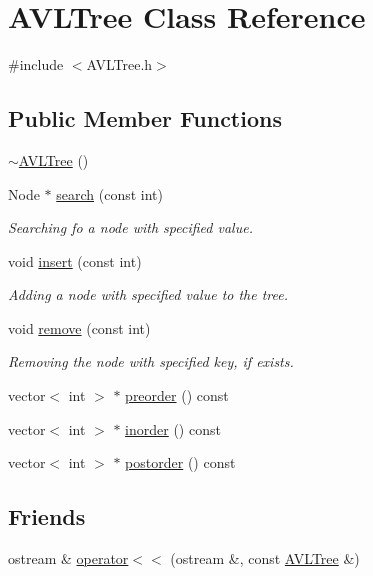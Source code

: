 \hypertarget{classAVLTree}{\section{A\-V\-L\-Tree Class Reference}
\label{classAVLTree}
}


{\ttfamily \#include $<$A\-V\-L\-Tree.\-h$>$}

\subsection*{Public Member Functions}
\begin{DoxyCompactItemize}
\item 
\hyperlink{classAVLTree_af4a1d1be1b6301ba59c6e101c6efc6ba}{$\sim$\-A\-V\-L\-Tree} ()
\item 
Node $\ast$ \hyperlink{classAVLTree_a03178f48ba61b538ec0b1394fec938b4}{search} (const int)
\begin{DoxyCompactList}\small\item\em Searching fo a node with specified value. \end{DoxyCompactList}\item 
void \hyperlink{classAVLTree_a50bc0809a20d87d79838b98b30e94ece}{insert} (const int)
\begin{DoxyCompactList}\small\item\em Adding a node with specified value to the tree. \end{DoxyCompactList}\item 
void \hyperlink{classAVLTree_a8671295418947911e9387549116f89eb}{remove} (const int)
\begin{DoxyCompactList}\small\item\em Removing the node with specified key, if exists. \end{DoxyCompactList}\item 
vector$<$ int $>$ $\ast$ \hyperlink{classAVLTree_a2a9e456d5db8167232a4b3bfca987abf}{preorder} () const 
\item 
vector$<$ int $>$ $\ast$ \hyperlink{classAVLTree_aeadd0a31d0366168b5e2accc04f2f481}{inorder} () const 
\item 
vector$<$ int $>$ $\ast$ \hyperlink{classAVLTree_a953fe7b7d3bce08e8d266db544c03415}{postorder} () const 
\end{DoxyCompactItemize}
\subsection*{Friends}
\begin{DoxyCompactItemize}
\item 
ostream \& \hyperlink{classAVLTree_a1c2fe2fa878a3a4e7c2315ac417b2721}{operator$<$$<$} (ostream \&, const \hyperlink{classAVLTree}{A\-V\-L\-Tree} \&)
\end{DoxyCompactItemize}



